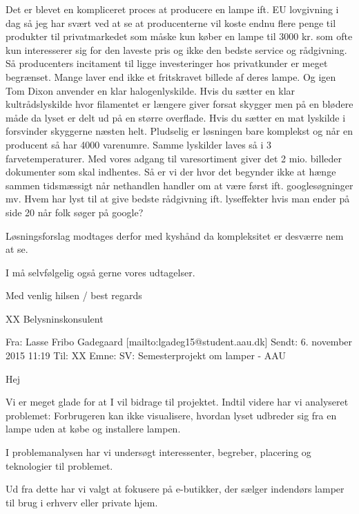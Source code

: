 \documentclass[oneside,a4paper,titlepage]{article}
\begin{document}
Det er blevet en kompliceret proces at producere en lampe ift. EU lovgivning i dag så jeg har svært ved at se at producenterne vil koste endnu flere penge til produkter til privatmarkedet som måske kun køber en lampe til 3000 kr. som ofte kun interesserer sig for den laveste pris og ikke den bedste service og rådgivning. Så producenters incitament til ligge investeringer hos privatkunder er meget begrænset. Mange laver end ikke et fritskravet billede af deres lampe. Og igen Tom Dixon anvender en klar halogenlyskilde. Hvis du sætter en klar kultrådslyskilde hvor filamentet er længere giver forsat skygger men på en blødere måde da lyset er delt ud på en større overflade. Hvis du sætter en mat lyskilde i forsvinder skyggerne næsten helt. Pludselig er løsningen bare komplekst og når en producent så har 4000 varenumre. Samme lyskilder laves så i 3 farvetemperaturer. Med vores adgang til varesortiment giver det 2 mio. billeder dokumenter som skal indhentes. Så er vi der hvor det begynder ikke at hænge sammen tidsmæssigt når nethandlen handler om at være først ift. googlesøgninger mv. Hvem har lyst til at give bedste rådgivning ift. lyseffekter hvis man ender på side 20 når folk søger på google?  

Løsningsforslag modtages derfor med kyshånd da kompleksitet er desværre nem at se. 

I må selvfølgelig også gerne vores udtagelser.  

Med venlig hilsen / best regards

XX\newline
Belysninskonsulent

\noindent\makebox[\linewidth]{\rule{\paperwidth}{0.4pt}}

Fra: Lasse Fribo Gadegaard [mailto:lgadeg15@student.aau.dk] \newline
Sendt: 6. november 2015 11:19\newline
Til: XX\newline
Emne: SV: Semesterprojekt om lamper - AAU

Hej 
 
Vi er meget glade for at I vil bidrage til projektet. Indtil videre har vi analyseret problemet: 
Forbrugeren kan ikke visualisere, hvordan lyset udbreder sig fra en lampe uden at købe og installere lampen. 

I problemanalysen har vi undersøgt interessenter, begreber, placering og teknologier til problemet. 

Ud fra dette har vi valgt at fokusere på e-butikker, der sælger indendørs lamper til brug i erhverv eller private hjem. 
\end{document}
